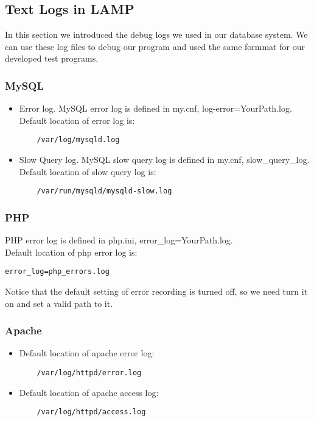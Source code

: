 \subsection{Text Logs in LAMP}
In this section we introduced the debug logs we used in our database system. 
We can use these log files to debug our program and used the same formmat for our developed test programs.
\subsubsection{MySQL}
\begin{itemize}
    \item
    Error log. MySQL error log is defined in my.cnf, log-error=YourPath.log.\\
    Default location of error log is:
    \begin{lstlisting}
    /var/log/mysqld.log
    \end{lstlisting}
    \item
    Slow Query log. MySQL slow query log is defined in my.cnf, slow\_query\_log.
    Default location of slow query log is:
    \begin{lstlisting}
    /var/run/mysqld/mysqld-slow.log
    \end{lstlisting}
\end{itemize}

\subsubsection{PHP}
PHP error log is defined in php.ini, error\_log=YourPath.log. \\
Default location of php error log is:
\begin{lstlisting}
error_log=php_errors.log
\end{lstlisting}
Notice that the default setting of error recording is turned off, so we need turn it on and set a valid path to it.

\subsubsection{Apache}
\begin{itemize}
    \item
    Default location of apache error log:
    \begin{lstlisting}
    /var/log/httpd/error.log
    \end{lstlisting}
    \item
    Default location of apache access log:
    \begin{lstlisting}
    /var/log/httpd/access.log
    \end{lstlisting}
\end{itemize}

